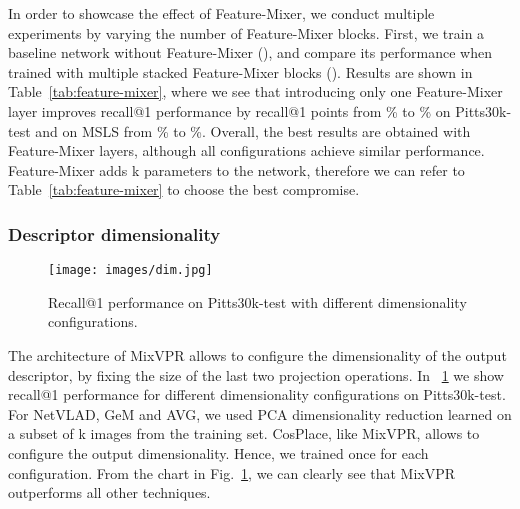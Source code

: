 \documentclass[10pt,twocolumn,letterpaper]{article}
\begin{document}
In order to showcase the effect of Feature-Mixer, we conduct multiple experiments by varying  the number of Feature-Mixer blocks. First, we train a baseline network  without Feature-Mixer (), and compare its performance when trained with multiple stacked Feature-Mixer blocks (). Results are shown in Table~\ref{tab:feature-mixer}, where we see that introducing only one Feature-Mixer layer improves recall@1 performance by  recall@1 points from \% to \% on Pitts30k-test and  on MSLS  from \% to \%. Overall, the best results are obtained with  Feature-Mixer layers, although all configurations achieve similar performance. Feature-Mixer adds k parameters to the network, therefore we can refer to Table~\ref{tab:feature-mixer} to choose the best compromise. 


\subsubsection{Descriptor dimensionality}
\begin{figure}[thb]
\begin{center}
\texttt{[image: images/dim.jpg]}
\end{center}
   \caption{Recall@1 performance on Pitts30k-test with different dimensionality configurations.}
\label{fig:dim}
\end{figure}
The architecture of MixVPR allows to configure the dimensionality of the output descriptor, by fixing the size of the last two projection operations. In ~\ref{fig:dim} we show recall@1 performance for different dimensionality configurations on Pitts30k-test. For NetVLAD, GeM and AVG, we used PCA dimensionality reduction learned on a subset of k images from the training set. CosPlace, like MixVPR, allows to configure the output dimensionality. Hence, we trained once for each configuration. From the chart in Fig.~\ref{fig:dim}, we can clearly see that MixVPR outperforms all other techniques. 
\end{document}
